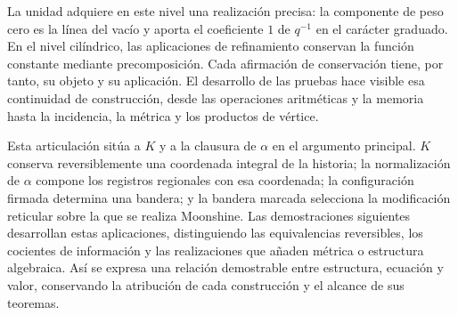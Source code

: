 La unidad adquiere en este nivel una realización precisa: la componente
de peso cero es la línea del vacío y aporta el coeficiente $1$ de
$q^{-1}$ en el carácter graduado. En el nivel cilíndrico, las
aplicaciones de refinamiento conservan la función constante mediante
precomposición. Cada afirmación de conservación tiene, por tanto, su
objeto y su aplicación. El desarrollo de las pruebas hace visible esa
continuidad de construcción, desde las operaciones aritméticas y la
memoria hasta la incidencia, la métrica y los productos de vértice.

Esta articulación sitúa a $K$ y a la clausura de $\alpha$ en el argumento
principal. $K$ conserva reversiblemente una coordenada integral de la
historia; la normalización de $\alpha$ compone los registros regionales
con esa coordenada; la configuración firmada determina una bandera; y
la bandera marcada selecciona la modificación reticular sobre la que se
realiza Moonshine. Las demostraciones siguientes desarrollan estas
aplicaciones, distinguiendo las equivalencias reversibles, los cocientes
de información y las realizaciones que añaden métrica o estructura
algebraica. Así se expresa una relación demostrable entre estructura,
ecuación y valor, conservando la atribución de cada construcción y el
alcance de sus teoremas.
